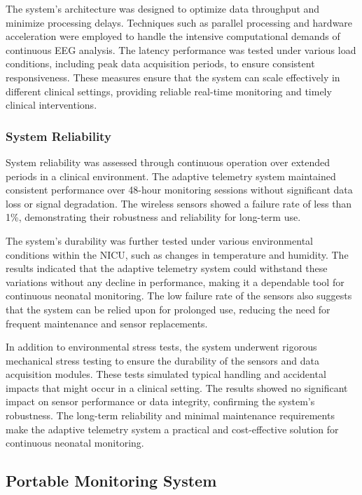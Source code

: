 \documentclass[12pt,journal,compsoc]{IEEEtran}
\begin{document}
The system's architecture was designed to optimize data throughput and minimize processing delays. Techniques such as parallel processing and hardware acceleration were employed to handle the intensive computational demands of continuous EEG analysis. The latency performance was tested under various load conditions, including peak data acquisition periods, to ensure consistent responsiveness. These measures ensure that the system can scale effectively in different clinical settings, providing reliable real-time monitoring and timely clinical interventions.

\subsubsection{System Reliability}

System reliability was assessed through continuous operation over extended periods in a clinical environment. The adaptive telemetry system maintained consistent performance over 48-hour monitoring sessions without significant data loss or signal degradation. The wireless sensors showed a failure rate of less than 1\%, demonstrating their robustness and reliability for long-term use.

The system's durability was further tested under various environmental conditions within the NICU, such as changes in temperature and humidity. The results indicated that the adaptive telemetry system could withstand these variations without any decline in performance, making it a dependable tool for continuous neonatal monitoring. The low failure rate of the sensors also suggests that the system can be relied upon for prolonged use, reducing the need for frequent maintenance and sensor replacements.

In addition to environmental stress tests, the system underwent rigorous mechanical stress testing to ensure the durability of the sensors and data acquisition modules. These tests simulated typical handling and accidental impacts that might occur in a clinical setting. The results showed no significant impact on sensor performance or data integrity, confirming the system's robustness. The long-term reliability and minimal maintenance requirements make the adaptive telemetry system a practical and cost-effective solution for continuous neonatal monitoring.

\subsection{Portable Monitoring System}
\end{document}

